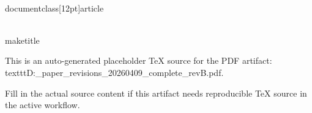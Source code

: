 ﻿\\documentclass[12pt]{article}
\begin{document}
\\maketitle

This is an auto-generated placeholder TeX source for the PDF artifact: \\texttt{D:\working_paper\DANNI\output\doc\main_revisions\main_20260409_complete_revB.pdf}.

Fill in the actual source content if this artifact needs reproducible TeX source in the active workflow.

\
\end{document}
